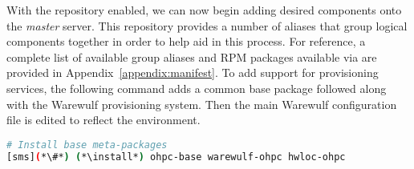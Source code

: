 With the \OHPC{} repository enabled, we can now begin adding desired components onto the
{\em master} server. This repository provides a number of aliases that group
logical components together in order to help aid in this process. For
reference, a complete list of available group aliases and RPM packages available
via \OHPC{} are provided in Appendix~\ref{appendix:manifest}. To add
support for provisioning services, the following command adds a common base 
package followed along with the Warewulf provisioning system. Then the main 
Warewulf configuration file is edited to reflect the environment. 


\begin{lstlisting}[language=bash,keywords={}]
# Install base meta-packages
[sms](*\#*) (*\install*) ohpc-base warewulf-ohpc hwloc-ohpc
\end{lstlisting}
